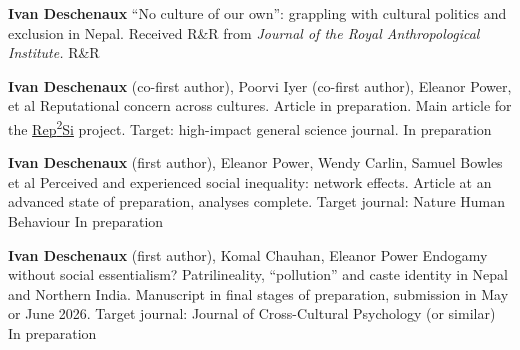 


\begin{cvpublications}

  \cvpublication
  {\textbf{Ivan Deschenaux}}
  {``No culture of our own'': grappling with cultural politics and exclusion in Nepal. Received R\&R from \textit{Journal of the Royal Anthropological Institute.}} %
  {R\&R} %

  \cvpublication
  {\textbf{Ivan Deschenaux} (co-first author), Poorvi Iyer (co-first author), Eleanor Power, et al}
  {Reputational concern across cultures. Article in preparation. Main article for the \textcolor{plainblue}{\href{https://rep2si.github.io/}{Rep\textsuperscript{2}Si}} project. Target: high-impact general science journal.} %
  {In preparation} %

  \cvpublication
  {\textbf{Ivan Deschenaux} (first author), Eleanor Power, Wendy Carlin, Samuel Bowles et al}
  {Perceived and experienced social inequality: network effects. Article at an advanced state of preparation, analyses complete. Target journal: Nature Human Behaviour} %
  {In preparation} %

  \cvpublication
  {\textbf{Ivan Deschenaux} (first author), Komal Chauhan, Eleanor Power}
  {Endogamy without social essentialism? Patrilineality, ``pollution'' and caste identity in Nepal and Northern India. Manuscript in final stages of preparation, submission in May or June 2026. Target journal: Journal of Cross-Cultural Psychology (or similar)} %
  {In preparation} %



\end{cvpublications}

